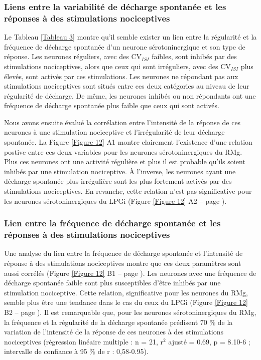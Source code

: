 \documentclass[a4paper,12pt,twoside]{report}
\begin{document}
\subsubsection{Liens entre la variabilité de décharge spontanée et les réponses à des stimulations nociceptives}

Le Tableau \ref{Tableau 3} montre qu’il semble exister un lien entre la régularité et la fréquence de décharge spontanée d’un neurone sérotoninergique et son type de réponse. Les neurones réguliers, avec des CV$_{ISI}$ faibles, sont inhibés par des stimulations nociceptives, alors que ceux qui sont irréguliers, avec des CV$_{ISI}$ plus élevés, sont activés par ces stimulations. Les neurones ne répondant pas aux stimulations nociceptives sont situés entre ces deux catégories au niveau de leur régularité de décharge. De même, les neurones inhibés ou non répondants ont une fréquence de décharge spontanée plus faible que ceux qui sont activés.

\begin{table}

 \label{Tableau 3}
\end{table}


Nous avons ensuite évalué la corrélation entre l’intensité de la réponse de ces neurones à une stimulation nociceptive et l’irrégularité de leur décharge spontanée. La Figure \ref{Figure 12} A1 montre clairement l’existence d’une relation postive entre ces deux variables pour les neurones sérotoninergiques du RMg. Plus ces neurones ont une activité régulière et plus il est probable qu’ils soient inhibés par une stimulation nociceptive. À l’inverse, les neurones ayant une décharge spontanée plus irrégulière sont les plus fortement activés par des stimulations nociceptives. En revanche, cette relation n’est pas significative pour les neurones sérotoninergiques du LPGi (Figure \ref{Figure 12} A2 – page \pageref{Figure 12}).

\subsubsection{Lien entre la fréquence de décharge spontanée et les réponses à des stimulations nociceptives}

Une analyse du lien entre la fréquence de décharge spontanée et l’intensité de réponse à des stimulations nociceptives montre que ces deux paramètres sont aussi corrélés (Figure \ref{Figure 12} B1 – page \pageref{Figure 12}). Les neurones avec une fréquence de décharge spontanée faible sont plus susceptibles d’être inhibés par une stimulation nociceptive. Cette relation, significative pour les neurones du RMg, semble plus être une tendance dans le cas du ceux du LPGi (Figure \ref{Figure 12} B2 – page \pageref{Figure 12}). Il est remarquable que, pour les neurones sérotoninergiques du RMg, la fréquence et la régularité de la décharge spontanée prédisent 70 \% de la variation de l’intensité de la réponse de ces neurones à des stimulations nociceptives (régression linéaire multiple : n = 21, r$^{2}$ ajusté = 0.69, p = 8.10-6 ; intervalle de confiance à 95 \% de r : 0,58-0.95). 
\end{document}
